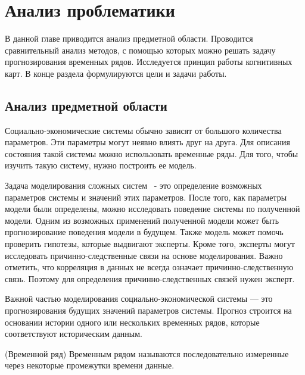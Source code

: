 

\chapter{Анализ проблематики }
\label{chapter1}

\begin{annotation}
	В данной главе приводится анализ предметной области.
	Проводится сравнительный анализ методов, с помощью которых
	можно решать задачу прогнозирования временных рядов.
	Исследуется принцип работы когнитивных карт.
	В конце раздела формулируются цели и задачи работы.
\end{annotation}


\section{Анализ предметной области}

Социально-экономические системы обычно зависят от большого количества параметров.
Эти параметры могут неявно влиять друг на друга. Для описания состояния такой системы
можно использовать временные ряды. Для того, чтобы изучить такую систему, нужно построить ее модель.

Задача моделирования сложных систем ~- это определение возможных параметров
системы и значений этих параметров. После того, как параметры модели были определены,
можно исследовать поведение системы по полученной модели. Одним из возможных
применений полученной модели может быть прогнозирование поведения модели в будущем.
Также модель может помочь проверить гипотезы, которые выдвигают эксперты.
Кроме того, эксперты могут исследовать причинно-следственные связи на основе моделирования.
Важно отметить, что корреляция в данных не всегда означает причинно-следственную связь.
Поэтому для определения причинно-следственных связей нужен эксперт.

Важной частью моделирования социально-экономической системы --- это
прогнозирования будущих значений параметров системы. Прогноз строится на основании
истории одного или нескольких временных рядов, которые соответствуют историческим данным.

\begin{definition}
	(Временной ряд)
	Временным рядом называются последовательно измеренные через некоторые промежутки времени данные.
\end{definition}

